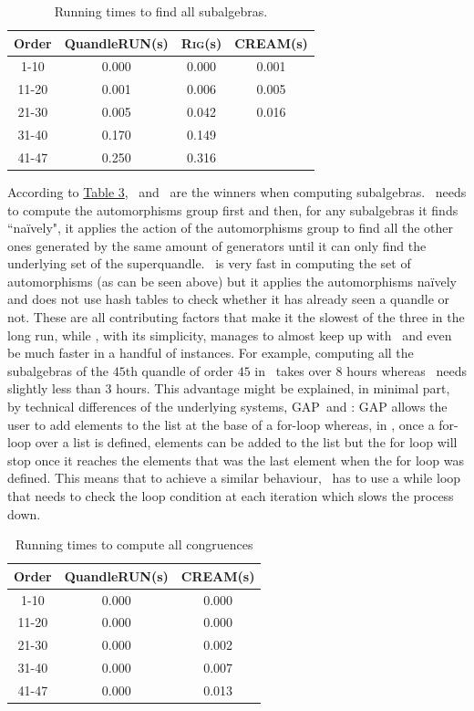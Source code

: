 \begin{table}[H]
    \label{subTable}
    \centering
    \begin{tabular}{|c|c|c|c|}
        \hline
         Order & \textsf{QuandleRUN}(s) & \textsc{Rig}(s) & \textsc{CREAM}(s) \\ \hline
         1-10 & 0.000 & 0.000 & 0.001 \\ \hline
         11-20 & 0.001 & 0.006 & 0.005 \\ \hline
         21-30 & 0.005 & 0.042 & 0.016 \\ \hline%
         31-40 & 0.170 & 0.149 &   \\ \hline
         41-47 & 0.250& 0.316&    \\ \hline
    \end{tabular}
    \caption{Running times to find all subalgebras.}
\end{table}
 \noindent According to \hyperref[subTable]{Table 3}, \Software~and \rig~are the winners when computing subalgebras. \cream~needs to compute the automorphisms group first and then, for any subalgebras it finds ``naïvely", it applies the action of the automorphisms group to find all the other ones generated by the same amount of generators until it can only find the underlying set of the superquandle. \cream~is very fast in computing the set of automorphisms (as can be seen above) but it applies the automorphisms naïvely and does not use hash tables to check whether it has already seen a quandle or not. These are all contributing factors that make it the slowest of the three in the long run, while \rig, with its simplicity, manages to almost keep up with \Software~and even be much faster in a handful of instances. For example, computing all the subalgebras of the $45$th quandle of order $45$ in \Software~takes over $8$ hours whereas \rig~needs slightly less than 3 hours. This advantage might be explained, in minimal part, by technical differences of the underlying systems, \textsc{GAP}~and \magma: \textsc{GAP} allows the user to add elements to the list at the base of a for-loop whereas, in \magma, once a for-loop over a list is defined, elements can be added to the list but the for loop will stop once it reaches the elements that was the last element when the for loop was defined. This means that to achieve a similar behaviour, \Software~has to use a while loop that needs to check the loop condition at each iteration which slows the process down.
\begin{table}[H]
    \centering
    \begin{tabular}{|c|c|c|}
        \hline
         Order & \textsf{QuandleRUN}(s) & \textsc{CREAM}(s) \\ \hline
          1-10 & 0.000 & 0.000 \\ \hline
         11-20 & 0.000 & 0.000 \\ \hline
         21-30 & 0.000 & 0.002\\ \hline
         31-40 & 0.000 & 0.007\\ \hline
         41-47 & 0.000 & 0.013 \\ \hline
    \end{tabular}
    \caption{Running times to compute all congruences}
    
\end{table}

